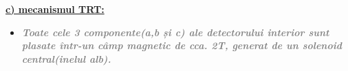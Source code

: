 \documentclass{beamer}
\begin{document}
\begin{frame}{\href{https://www.youtube.com/watch?v=gljjW2Pqz5g&t=410s}{\textbf{c) mecanismul TRT:}}}


 \vspace{3cm}

\small

\begin{itemize}

\small 
\item[\ding{66}]\makebox[0.5cm]{} \textcolor{gray}{\textbf{\textit{Toate cele 3 componente(a,b și c) ale detectorului interior sunt plasate într-un câmp magnetic de cca. 2T, generat de un solenoid central(inelul alb).}}}

\end{itemize}

\end{frame}



\end{document}
